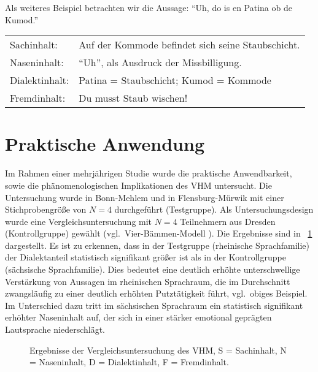 \documentclass[11pt,DIV16,twocolumn]{scrartcl}
\begin{document}
%
Als weiteres Beispiel betrachten wir die Aussage: "`Uh, do is en
Patina ob de Kumod."'
%
\begin{center}
  \begin{tabularx}{\linewidth}{lX}
    Sachinhalt: & Auf der Kommode befindet sich seine Staubschicht. \\
    Naseninhalt: & "`Uh"', als Ausdruck der Missbilligung. \\
    Dialektinhalt: & Patina = Staubschicht; Kumod = Kommode \\
    Fremdinhalt: & Du musst Staub wischen!
  \end{tabularx}
\end{center}

\section{Praktische Anwendung}

Im Rahmen einer mehrjährigen Studie wurde die praktische
Anwendbarkeit, sowie die phänomenologischen Implikationen des VHM
untersucht.  Die Untersuchung wurde in Bonn-Mehlem und in
Flensburg-Mürwik mit einer Stichprobengröße von $N=4$ durchgeführt
(Testgruppe).  Als Untersuchungsdesign wurde eine
Vergleichsuntersuchung mit $N=4$ Teilnehmern aus Dresden
(Kontrollgruppe) gewählt (vgl.\ Vier-Bämmen-Modell \cite{VBM}).  Die
Ergebnisse sind in \figurename~\ref{fig:VHM} dargestellt.  Es ist zu
erkennen, dass in der Testgruppe (rheinische Sprachfamilie) der
Dialektanteil statistisch signifikant größer ist als in der
Kontrollgruppe (sächsische Sprachfamilie).  Dies bedeutet eine
deutlich erhöhte unterschwellige Verstärkung von Aussagen im
rheinischen Sprachraum, die im Durchschnitt zwangsläufig zu einer
deutlich erhöhten Putztätigkeit führt, vgl.\ obiges Beispiel.  Im
Unterschied dazu tritt im sächsischen Sprachraum ein statistisch
signifikant erhöhter Naseninhalt auf, der sich in einer stärker
emotional geprägten Lautsprache niederschlägt.

\begin{figure}[tb]
  \centering
  \caption{Ergebnisse der Vergleichsuntersuchung des VHM, S =
    Sachinhalt, N = Naseninhalt, D = Dialektinhalt, F = Fremdinhalt.}
  \label{fig:VHM}
\end{figure}
\end{document}
